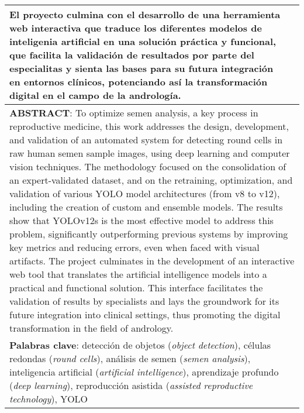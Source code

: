 \begin{longtable}{|l|l|}
{	El proyecto culmina con el desarrollo de una herramienta web interactiva que traduce los diferentes modelos de inteligenia artificial 
	en una solución práctica y funcional, que facilita la validación de resultados por parte del especialitas y sienta las bases para su futura integración en entornos clínicos, potenciando así 
	la transformación digital en el campo de la andrología.} \\ \hline
	\multicolumn{2}{|p{17cm}|}{\textbf{ABSTRACT}: To optimize semen analysis, a key process in reproductive medicine, this work addresses the design, development, and validation of an automated system 
	for detecting round cells in raw human semen sample images, using deep learning and computer vision techniques.
	The methodology focused on the consolidation of an expert-validated dataset, and on the retraining, optimization, and validation of various YOLO model architectures (from v8 to v12), 
	including the creation of custom and ensemble models. The results show that YOLOv12s is the most effective model to address this problem, significantly outperforming previous systems 
	by improving key metrics and reducing errors, even when faced with visual artifacts.
	The project culminates in the development of an interactive web tool that translates the artificial intelligence models into a practical and functional solution. This interface facilitates 
	the validation of results by specialists and lays the groundwork for its future integration into clinical settings, thus promoting the digital transformation in the field of andrology.} \\ 
	\hline
	\multicolumn{2}{|p{17cm}|}{\textbf{Palabras clave}: detección de objetos (\textit{object detection}), células redondas (\textit{round cells}), 
	análisis de semen (\textit{semen analysis}), inteligencia artificial (\textit{artificial intelligence}), aprendizaje profundo (\textit{deep learning}), reproducción asistida (\textit{assisted reproductive technology}), YOLO}	\\ 
	\hline
\end{longtable}
